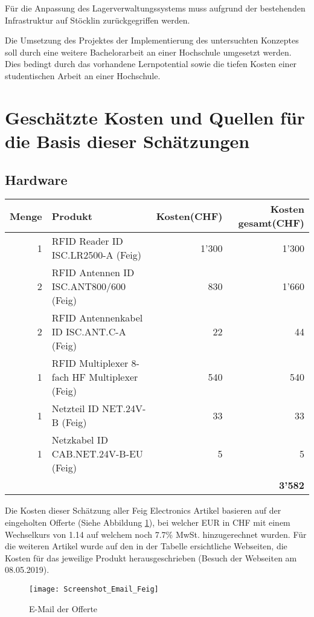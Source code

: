 Für die Anpassung des Lagerverwaltungssystems muss aufgrund der bestehenden Infrastruktur auf Stöcklin zurückgegriffen werden.

Die Umsetzung des Projektes der Implementierung des untersuchten Konzeptes soll durch eine weitere Bachelorarbeit an einer Hochschule umgesetzt werden. Dies bedingt durch das vorhandene Lernpotential sowie die tiefen Kosten einer studentischen Arbeit an einer Hochschule.

\section{Geschätzte Kosten und Quellen für die Basis dieser Schätzungen}
\subsection{Hardware}
\label{ssec:HardwareKosten}
\begin{tabularx}{\textwidth}{|r|X|r|r|}
	\hline
	\textbf{Menge} & \textbf{Produkt} & \textbf{Kosten(CHF)} & \textbf{Kosten gesamt(CHF)} \\
	\hline
	1 & RFID Reader ID ISC.LR2500-A (Feig) & 1'300 & 1'300 \\
	\hline
	2 & RFID Antennen ID ISC.ANT800/600 (Feig)& 830 & 1'660 \\
	\hline
	2 & RFID Antennenkabel ID ISC.ANT.C-A (Feig) & 22 & 44 \\
	\hline
	1 & RFID Multiplexer 8-fach HF Multiplexer (Feig) & 540 & 540 \\
	\hline
	1 & Netzteil ID NET.24V-B (Feig) & 33 & 33 \\
	\hline
	1 & Netzkabel ID CAB.NET.24V-B-EU (Feig) & 5 & 5 \\
	\hline
	& & & \textbf{3'582} \\
	\hline
\end{tabularx}

Die Kosten dieser Schätzung aller Feig Electronics Artikel basieren auf der eingeholten Offerte (Siehe Abbildung \ref{fig:offerteFeig}), bei welcher EUR in CHF mit einem Wechselkurs von 1.14 auf welchem noch 7.7\% MwSt. hinzugerechnet wurden.
Für die weiteren Artikel wurde auf den in der Tabelle ersichtliche Webseiten, die Kosten für das jeweilige Produkt herausgeschrieben (Besuch der Webseiten am 08.05.2019).

\begin{figure}[htb]
	\centering
	\texttt{[image: Screenshot\_Email\_Feig]}
	\caption{E-Mail der Offerte}
	\label{fig:offerteFeig}
\end{figure}

